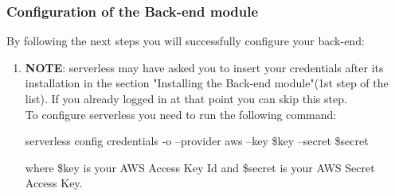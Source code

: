 \subsubsection{Configuration of the Back-end module}
By following the next steps you will successfully configure your back-end:
\begin{enumerate}
\item \textbf{NOTE}: serverless may have asked you to insert your credentials after its installation in the section "Installing the Back-end module"(1st step of the list). If you already logged in at that point you can skip this step.\\ 
To configure serverless you need to run the following command:
\begin{center}
serverless config credentials -o --provider aws --key \$key --secret \$secret
\end{center}
where \$key is your AWS Access Key Id and \$secret is your AWS Secret Access Key.
\end{enumerate}
